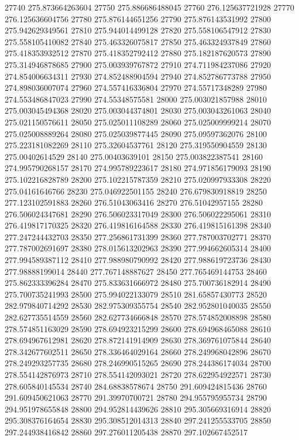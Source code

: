 {27740 275.873664263604
27750 275.886686488045
27760 276.125637721928
27770 276.125636604756
27780 275.876144651256
27790 275.876143531992
27800 275.942629349561
27810 275.944014499128
27820 275.558106547912
27830 275.558105410082
27840 275.463326075817
27850 275.463324937849
27860 275.418353932512
27870 275.418352792412
27880 275.182187620573
27890 275.314946878685
27900 275.003939767872
27910 274.711984237086
27920 274.854006634311
27930 274.852488904594
27940 274.852786773788
27950 274.898036007074
27960 274.557416336804
27970 274.55717348289
27980 274.553486847023
27990 274.55348575581
28000 275.003021857988
28010 275.003045494368
28020 275.003044374801
28030 275.003043261063
28040 275.021150576611
28050 275.025011108289
28060 275.025009999214
28070 275.025008889264
28080 275.025039877445
28090 275.09597362076
28100 275.223181082269
28110 275.32604537761
28120 275.319550904559
28130 275.00402614529
28140 275.00403639101
28150 275.003822387541
28160 274.995790268157
28170 274.995789223617
28180 274.971856179093
28190 275.102216828789
28200 275.102215787359
28210 275.020997933308
28220 275.04161646766
28230 275.046922501155
28240 276.679830918819
28250 277.123102591883
28260 276.51043063416
28270 276.51042957155
28280 276.506024347681
28290 276.506023317049
28300 276.506022295061
28310 276.419817170325
28320 276.419816164588
28330 276.419815161398
28340 277.247244432703
28350 277.256861731399
28360 277.787003702771
28370 277.787002691697
28380 278.015613202963
28390 277.994662605314
28400 277.994589387112
28410 277.988980790992
28420 277.988619723736
28430 277.98888199014
28440 277.767148887627
28450 277.765469144753
28460 275.862333396284
28470 275.833631666972
28480 275.700736182914
28490 275.700735241993
28500 275.994022133079
28510 281.65857430773
28520 282.979840714292
28530 282.975309355754
28540 282.952801040035
28550 282.627735514559
28560 282.627734666848
28570 278.574852008898
28580 278.574851163029
28590 278.694923215299
28600 278.694968465088
28610 278.694967612981
28620 278.872141914909
28630 278.369761075844
28640 278.342677602511
28650 278.336464029164
28660 278.249968042896
28670 278.249293257735
28680 278.246990515265
28690 278.244386174034
28700 278.554142876973
28710 278.554142093021
28720 278.622954922571
28730 278.605840145534
28740 284.68838578674
28750 291.609424815436
28760 291.609450621063
28770 291.39970700721
28780 294.955795955734
28790 294.951978655848
28800 294.952814439626
28810 295.305669316914
28820 295.308376164654
28830 295.308512014313
28840 297.241255533705
28850 297.244938416842
28860 297.276011205438
28870 297.102667452517
}
